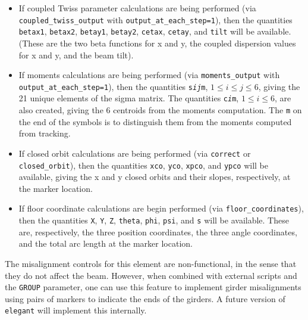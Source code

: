 \begin{itemize}
  {\tt alphax}, {\tt betax}, {\tt nux}, {\tt etax}, {\tt etapx}, and {\tt etaxp}, along with similarly-named
  quantities for the vertical plane, will be available, giving twiss parameter values at the marker location.
  Note that {\tt etapx} and {\tt etaxp} are the same, being alternate names for $\eta_x^\prime$.  If radiation integrals are requested,
  the values of the radiation integrals are available in the quantities {\tt I1}, {\tt I2}, etc.
\item If coupled Twiss parameter calculations are being performed (via {\tt coupled\_twiss\_output} with {\tt output\_at\_each\_step=1}),
  then the quantities  \verb|betax1|, \verb|betax2|, \verb|betay1|, \verb|betay2|, \verb|cetax|, \verb|cetay|, and \verb|tilt| will be available.
  (These are the two beta functions for x and y, the coupled dispersion values for x and y, and the beam tilt). 
\item If moments calculations are being performed (via {\tt moments\_output} with  {\tt output\_at\_each\_step=1}), then the quantities 
 {\tt s{\em i}{\em j}m}, $1 \leq i\leq j\leq 6$, giving the 21 unique elements of the sigma matrix.  The quantities {\tt c{\em i}m}, $1\leq i \leq 6$,
 are also created, giving the 6 centroids from the moments computation.  The
 {\tt m} on the end of the symbols is to distinguish them from the moments computed from tracking.
\item If closed orbit calculations are being performed (via {\tt correct} or {\tt closed\_orbit}), then
  the quantities {\tt xco}, {\tt yco}, {\tt xpco}, and {\tt ypco} will be available, giving the
  x and y closed orbits and their slopes, respectively, at the marker location.
\item If floor coordinate calculations are begin performed (via {\tt floor\_coordinates}), then the quantities
  {\tt X}, {\tt Y}, {\tt Z}, {\tt theta}, {\tt phi}, {\tt psi}, and {\tt s} will be available.  These are,
  respectively, the three position coordinates, the three angle coordinates, and the total arc length
  at the marker location.
\end{itemize}

The misalignment controls for this element are non-functional, in the sense that they do not affect the beam.
However, when combined with external scripts and the \verb|GROUP| parameter, one can use this feature to
implement girder misalignments using pairs of markers to indicate the ends of the girders.  A future version
of {\tt elegant} will implement this internally.
